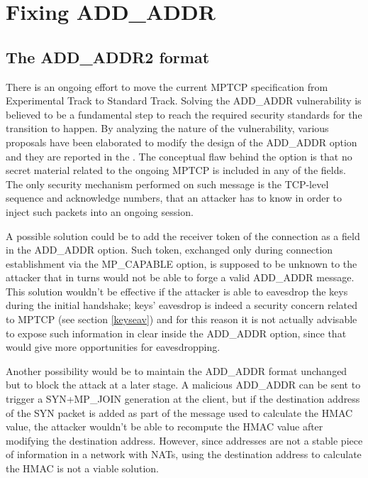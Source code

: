 \chapter{Fixing ADD\_ADDR}
\label{chap:addaddr2}

\section{The ADD\_ADDR2 format}
There is an ongoing effort to move the current MPTCP specification  from Experimental Track to Standard Track. Solving the ADD\_ADDR vulnerability is believed to be a fundamental step to reach the required security standards for the transition to happen.
By analyzing the nature of the vulnerability, various proposals have been elaborated to modify the design of the ADD\_ADDR option and they are reported in the . The conceptual flaw behind the option is that no secret material related to the ongoing MPTCP is included in any of the fields. The only security mechanism performed on such message is the TCP-level sequence and acknowledge numbers, that an attacker has to know in order to inject such packets into an ongoing session.

A possible solution could be to add the receiver token of the connection as a field in the ADD\_ADDR option. Such token, exchanged only during connection establishment via the MP\_CAPABLE option, is supposed to be unknown to the attacker that in turns would not be able to forge a valid ADD\_ADDR message. This solution wouldn't be effective if the attacker is able to eavesdrop the keys during the initial handshake; keys' eavesdrop is indeed a security concern related to MPTCP (see section \ref{keyseav}) and for this reason it is not actually advisable to expose such information in clear inside the ADD\_ADDR option, since that would give more opportunities for eavesdropping.

Another possibility would be to maintain the ADD\_ADDR format unchanged but to block the attack at a later stage. A malicious ADD\_ADDR can be sent to trigger a SYN+MP\_JOIN generation at the client, but if the destination address of the SYN packet is added as part of the message used to calculate the HMAC value, the attacker wouldn't be able to recompute the HMAC value after modifying the destination address. However, since addresses are not a stable piece of information in a network with NATs, using the destination address to calculate the HMAC is not a viable solution.

